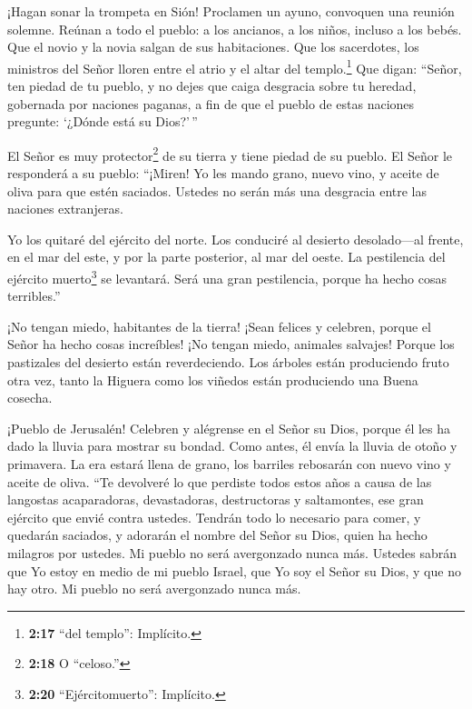  ¡Hagan sonar la trompeta en Sión! Proclamen un ayuno,
convoquen una reunión solemne.  Reúnan a todo el pueblo: a
los ancianos, a los niños, incluso a los bebés. Que el novio y la novia
salgan de sus habitaciones.  Que los sacerdotes, los
ministros del Señor lloren entre el atrio y el altar del
templo.\footnote{\textbf{2:17} ``del templo'': Implícito.} Que digan:
``Señor, ten piedad de tu pueblo, y no dejes que caiga desgracia sobre
tu heredad, gobernada por naciones paganas, a fin de que el pueblo de
estas naciones pregunte: `¿Dónde está su Dios?'\,''

 El Señor es muy protector\footnote{\textbf{2:18} O
  ``celoso.''} de su tierra y tiene piedad de su pueblo. 
El Señor le responderá a su pueblo: ``¡Miren! Yo les mando grano, nuevo
vino, y aceite de oliva para que estén saciados. Ustedes no serán más
una desgracia entre las naciones extranjeras.

 Yo los quitaré del ejército del norte. Los conduciré al
desierto desolado---al frente, en el mar del este, y por la parte
posterior, al mar del oeste. La pestilencia del ejército
muerto\footnote{\textbf{2:20} ``Ejércitomuerto'': Implícito.} se
levantará. Será una gran pestilencia, porque ha hecho cosas terribles.''

 ¡No tengan miedo, habitantes de la tierra! ¡Sean felices y
celebren, porque el Señor ha hecho cosas increíbles!  ¡No
tengan miedo, animales salvajes! Porque los pastizales del desierto
están reverdeciendo. Los árboles están produciendo fruto otra vez, tanto
la Higuera como los viñedos están produciendo una Buena cosecha.

 ¡Pueblo de Jerusalén! Celebren y alégrense en el Señor su
Dios, porque él les ha dado la lluvia para mostrar su bondad. Como
antes, él envía la lluvia de otoño y primavera.  La era
estará llena de grano, los barriles rebosarán con nuevo vino y aceite de
oliva.  ``Te devolveré lo que perdiste todos estos años a
causa de las langostas acaparadoras, devastadoras, destructoras y
saltamontes, ese gran ejército que envié contra ustedes. 
Tendrán todo lo necesario para comer, y quedarán saciados, y adorarán el
nombre del Señor su Dios, quien ha hecho milagros por ustedes. Mi pueblo
no será avergonzado nunca más.  Ustedes sabrán que Yo estoy
en medio de mi pueblo Israel, que Yo soy el Señor su Dios, y que no hay
otro. Mi pueblo no será avergonzado nunca más.

